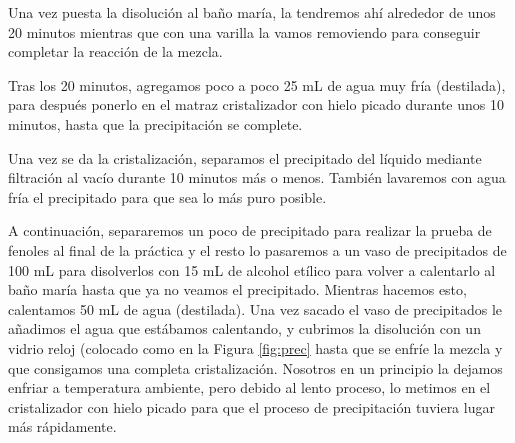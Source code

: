 \vspace{0.2cm}

\noindent Una vez puesta la disolución al baño maría, la tendremos ahí alrededor de unos 20 minutos mientras que con una varilla la vamos removiendo para conseguir completar la reacción de la mezcla.

\vspace{0.2cm}

\noindent Tras los 20 minutos, agregamos poco a poco 25 mL de agua muy fría (destilada), para después ponerlo en el matraz cristalizador con hielo picado durante unos 10 minutos, hasta que la precipitación se complete.

\vspace{0.2cm}

\noindent Una vez se da la cristalización, separamos el precipitado del líquido mediante filtración al vacío durante 10 minutos más o menos. También lavaremos con agua fría el precipitado para que sea lo más puro posible.

\vspace{0.2cm}

\noindent A continuación, separaremos un poco de precipitado para realizar la prueba de fenoles al final de la práctica y el resto lo pasaremos a un vaso de precipitados de 100 mL para disolverlos con 15 mL de alcohol etílico para volver a calentarlo al baño maría hasta que ya no veamos el precipitado. Mientras hacemos esto, calentamos 50 mL de agua (destilada). Una vez sacado el vaso de precipitados le añadimos el agua que estábamos calentando, y cubrimos la disolución con un vidrio reloj (colocado como en la Figura \ref{fig:prec} hasta que se enfríe la mezcla y que consigamos una completa cristalización. Nosotros en un principio la dejamos enfriar a temperatura ambiente, pero debido al lento proceso, lo metimos en el cristalizador con hielo picado para que el proceso de precipitación tuviera lugar más rápidamente.


\vspace{0.4cm}

